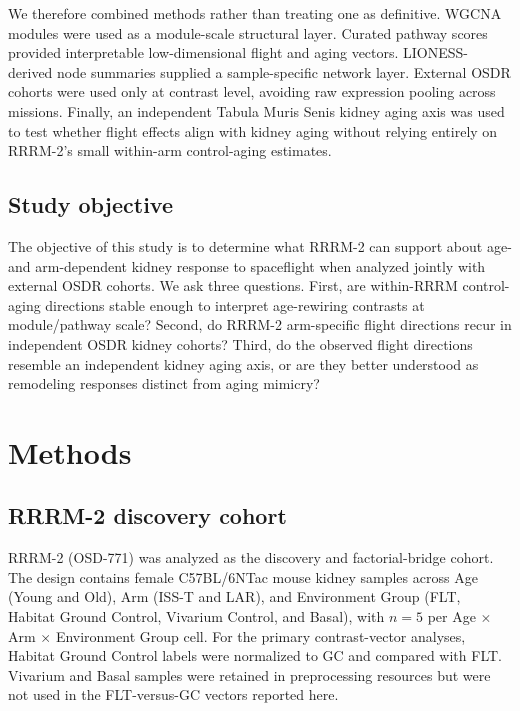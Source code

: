 \documentclass[11pt]{article}
\begin{document}
We therefore combined methods rather than treating one as definitive. WGCNA modules were used as a module-scale structural layer. Curated pathway scores provided interpretable low-dimensional flight and aging vectors. LIONESS-derived node summaries supplied a sample-specific network layer. External OSDR cohorts were used only at contrast level, avoiding raw expression pooling across missions. Finally, an independent Tabula Muris Senis kidney aging axis was used to test whether flight effects align with kidney aging without relying entirely on RRRM-2's small within-arm control-aging estimates.

\subsection{Study objective}

The objective of this study is to determine what RRRM-2 can support about age- and arm-dependent kidney response to spaceflight when analyzed jointly with external OSDR cohorts. We ask three questions. First, are within-RRRM control-aging directions stable enough to interpret age-rewiring contrasts at module/pathway scale? Second, do RRRM-2 arm-specific flight directions recur in independent OSDR kidney cohorts? Third, do the observed flight directions resemble an independent kidney aging axis, or are they better understood as remodeling responses distinct from aging mimicry?

\section{Methods}

\subsection{RRRM-2 discovery cohort}

RRRM-2 (OSD-771) was analyzed as the discovery and factorial-bridge cohort. The design contains female C57BL/6NTac mouse kidney samples across Age (Young and Old), Arm (ISS-T and LAR), and Environment Group (FLT, Habitat Ground Control, Vivarium Control, and Basal), with $n=5$ per Age $\times$ Arm $\times$ Environment Group cell. For the primary contrast-vector analyses, Habitat Ground Control labels were normalized to GC and compared with FLT. Vivarium and Basal samples were retained in preprocessing resources but were not used in the FLT-versus-GC vectors reported here.
\end{document}
